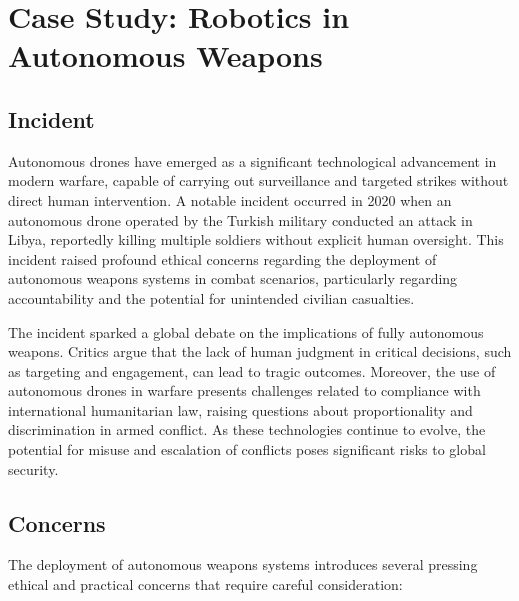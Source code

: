 \section{Case Study: Robotics in Autonomous Weapons}

\subsection{Incident}
Autonomous drones have emerged as a significant technological advancement in modern warfare, capable of carrying out surveillance and targeted strikes without direct human intervention. A notable incident occurred in 2020 when an autonomous drone operated by the Turkish military conducted an attack in Libya, reportedly killing multiple soldiers without explicit human oversight. This incident raised profound ethical concerns regarding the deployment of autonomous weapons systems in combat scenarios, particularly regarding accountability and the potential for unintended civilian casualties.\cite{SHARIF202061}

The incident sparked a global debate on the implications of fully autonomous weapons. Critics argue that the lack of human judgment in critical decisions, such as targeting and engagement, can lead to tragic outcomes. Moreover, the use of autonomous drones in warfare presents challenges related to compliance with international humanitarian law, raising questions about proportionality and discrimination in armed conflict. As these technologies continue to evolve, the potential for misuse and escalation of conflicts poses significant risks to global security.

\subsection{Concerns}
The deployment of autonomous weapons systems introduces several pressing ethical and practical concerns that require careful consideration:

